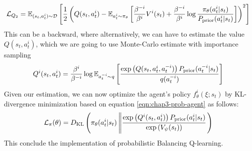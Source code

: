 \begin{equation}
    \mathcal{L}_{Q_2} = \mathbb{E}_{(s_t, a^{i}_t) \sim \mathcal{D}}\left[ \frac{1}{2}\left( Q(s_t, a^{i}_t) - \mathbb{E}_{a^i_t \sim \pi_\theta}\left[ \frac{\beta^{-i}}{\beta^i}V^i(s_t) + \frac{\beta^{-i}}{\beta^i}\log \frac{\pi_\theta(a^i_t | s_t)}{P_{\text{prior}}(a^i_t | s_t)} \right] \right)^2 \right]
\end{equation}
This can be a backward, where alternatively, we can have to estimate the value $Q(s_t, a^{i}_t)$, which we are going to use Monte-Carlo estimate with importance sampling 
\begin{equation}
    Q^i(s_t, a^{i}_t) = \frac{\beta^{i}}{\beta^{-i}}\log \mathbb{E}_{a^{-i}_t \sim q}\left[ \frac{\exp\left( Q(s_t, a^{i}_t, a^{-i}_t) \right) P_{\text{prior}}(a^{-i}_t | s_t)}{q(a^{-i}_t)} \right]
\end{equation}
Given our estimation, we can now optimize the agent's policy $f^{i}_\theta(\xi ; s_t)$ by KL-divergence minimization based on equation \ref{eqn:chap3-prob-agent} as follows:
\begin{equation}
    \mathcal{L}_\pi(\theta) = D_{\mathrm{KL}}\left( \pi_\theta(a^{i}_t | s_t) \left\| \frac{\exp \left( Q^i(s_t, a^{i}_t) \right) P_{\text{prior}}(a^i_t | s_t)}{\exp\left( V_\psi(s_t) \right)} \right. \right)
\end{equation}
This conclude the implementation of probabilistic Balancing Q-learning. 